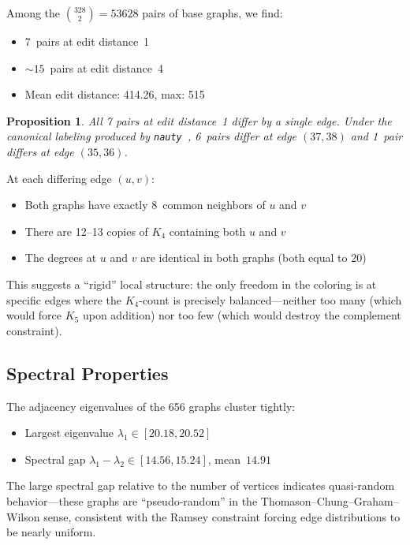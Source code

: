 \documentclass[11pt,a4paper]{article}
\newtheorem{proposition}[theorem]{Proposition}
\theoremstyle{definition}
\theoremstyle{remark}
\begin{document}
Among the $\binom{328}{2} = 53628$ pairs of base graphs,
we find:
\begin{itemize}
  \item 7~pairs at edit distance~1
  \item $\sim 15$~pairs at edit distance~4
  \item Mean edit distance: 414.26, max: 515
\end{itemize}

\begin{proposition}
All 7 pairs at edit distance~1 differ by a single edge.
Under the canonical labeling produced by \texttt{nauty}~\cite{McKay2014nauty},
6~pairs differ at edge $(37,38)$ and 1~pair
differs at edge $(35,36)$.
\end{proposition}

At each differing edge $(u,v)$:
\begin{itemize}
  \item Both graphs have exactly 8~common neighbors of $u$ and $v$
  \item There are 12--13 copies of $K_4$ containing both $u$ and $v$
  \item The degrees at $u$ and $v$ are identical in both graphs
    (both equal to 20)
\end{itemize}

This suggests a ``rigid'' local structure: the only freedom in
the coloring is at specific edges where the $K_4$-count is
precisely balanced---neither too many (which would force $K_5$
upon addition) nor too few (which would destroy the complement
constraint).

\subsection{Spectral Properties}

The adjacency eigenvalues of the 656 graphs cluster tightly:
\begin{itemize}
  \item Largest eigenvalue $\lambda_1 \in [20.18, 20.52]$
  \item Spectral gap $\lambda_1 - \lambda_2 \in [14.56, 15.24]$,
    mean~$14.91$
\end{itemize}

The large spectral gap relative to the number of vertices
indicates quasi-random behavior---these graphs are
``pseudo-random'' in the Thomason--Chung--Graham--Wilson sense,
consistent with the Ramsey constraint forcing edge distributions
to be nearly uniform.
\end{document}
